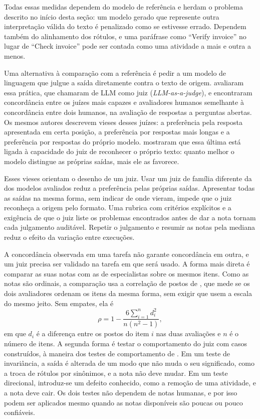 Todas essas medidas dependem do modelo de referência e herdam o problema descrito no início desta seção: um modelo gerado que represente outra interpretação válida do texto é penalizado como se estivesse errado. Dependem também do alinhamento dos rótulos, e uma paráfrase como ``Verify invoice'' no lugar de ``Check invoice'' pode ser contada como uma atividade a mais e outra a menos.

Uma alternativa à comparação com a referência é pedir a um modelo de linguagem que julgue a saída diretamente contra o texto de origem.  avaliaram essa prática, que chamaram de LLM como juiz (\textit{LLM-as-a-judge}), e encontraram concordância entre os juízes mais capazes e avaliadores humanos semelhante à concordância entre dois humanos, na avaliação de respostas a perguntas abertas. Os mesmos autores descrevem vieses desses juízes: a preferência pela resposta apresentada em certa posição, a preferência por respostas mais longas e a preferência por respostas do próprio modelo.  mostraram que essa última está ligada à capacidade do juiz de reconhecer o próprio texto: quanto melhor o modelo distingue as próprias saídas, mais ele as favorece.

Esses vieses orientam o desenho de um juiz. Usar um juiz de família diferente da dos modelos avaliados reduz a preferência pelas próprias saídas. Apresentar todas as saídas na mesma forma, sem indicar de onde vieram, impede que o juiz reconheça a origem pelo formato. Uma rubrica com critérios explícitos e a exigência de que o juiz liste os problemas encontrados antes de dar a nota tornam cada julgamento auditável. Repetir o julgamento e resumir as notas pela mediana reduz o efeito da variação entre execuções.

A concordância observada em uma tarefa não garante concordância em outra, e um juiz precisa ser validado na tarefa em que será usado. A forma mais direta é comparar as suas notas com as de especialistas sobre os mesmos itens. Como as notas são ordinais, a comparação usa a correlação de postos de , que mede se os dois avaliadores ordenam os itens da mesma forma, sem exigir que usem a escala do mesmo jeito. Sem empates, ela é
\begin{equation}
	\rho = 1 - \frac{6 \sum_{i=1}^{n} d_i^2}{n (n^2 - 1)},
\end{equation}
em que $d_i$ é a diferença entre os postos do item $i$ nas duas avaliações e $n$ é o número de itens. A segunda forma é testar o comportamento do juiz com casos construídos, à maneira dos testes de comportamento de . Em um teste de invariância, a saída é alterada de um modo que não muda o seu significado, como a troca de rótulos por sinônimos, e a nota não deve mudar. Em um teste direcional, introduz-se um defeito conhecido, como a remoção de uma atividade, e a nota deve cair. Os dois testes não dependem de notas humanas, e por isso podem ser aplicados mesmo quando as notas disponíveis são poucas ou pouco confiáveis.

